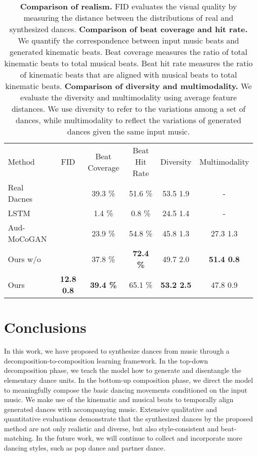 \documentclass{article}
\newlength\figmargin
\newlength\secmargin
\begin{document}
\begin{table}
\centering
\begin{tabular}{l c  c c  c c}
        \toprule
        Method        & FID & Beat Coverage & Beat Hit Rate & Diversity & Multimodality \\
        \cmidrule(lr){2-2}\cmidrule(lr){3-4}\cmidrule(lr){5-6}
Real Dacnes   &  &  39.3 \%       & 51.6 \%   &    53.5  1.9 & -     \\
        \midrule
        LSTM         &  & 1.4 \%        & 0.8  \%     & 24.5   1.4            &  -         \\
        Aud-MoCoGAN  &  & 23.9 \%       & 54.8 \%      & 45.8  1.3             & 27.3  1.3       \\
        Ours w/o  &   & 37.8 \% & \textbf{72.4 \%}  &  49.7  2.0 & \textbf{51.4  0.8}            \\
        Ours    & \textbf{12.8  0.8}  & \textbf{39.4 \%} & 65.1 \%   & \textbf{53.2  2.5}    & 47.8  0.9             \\
        \bottomrule
    \end{tabular}
    \vspace{2mm}
    \caption{
    \textbf{Comparison of realism.}
    FID evaluates the visual quality by measuring the distance between the distributions of real and synthesized dances. 
    \textbf{Comparison of beat coverage and hit rate.}
    We quantify the correspondence between input music beats and  generated kinematic beats.
Beat coverage measures the ratio of total kinematic beats to total musical beats.
Beat hit rate measures the ratio of kinematic beats that are aligned with musical beats to total kinematic beats.
    \textbf{Comparison of diversity and multimodality.}
    We evaluate the diversity and multimodality using average feature distances.
We use diversity to refer to the variations among a set of dances, while multimodality to reflect the variations of generated dances given the same input music.
    }
    
\label{tab:beat}
\vspace{\figmargin}
\end{table}

\section{Conclusions}
\label{sec:conclusion}
\vspace{\secmargin}
In this work, we have proposed to synthesize dances from music through a decomposition-to-composition learning framework.
In the top-down decomposition phase, we teach the model how to generate and disentangle the elementary dance units.
In the bottom-up composition phase, we direct the model to meaningfully compose the basic dancing movements conditioned on the input music.
We make use of the kinematic and musical beats to temporally align generated dances with accompanying music.     
Extensive qualitative and quantitative evaluations demonstrate that the synthesized dances by the proposed method are not only realistic and diverse, but also style-consistent and beat-matching. In the future work, we will continue to collect and incorporate more dancing styles, such as pop dance and partner dance. 

\clearpage
{\small


}
\end{document}
